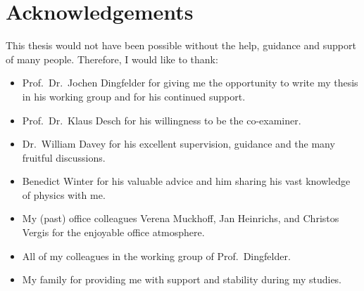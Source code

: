 \chapter{Acknowledgements}
\label{sec:ack}

This thesis would not have been possible without the help, guidance and support
of many people. Therefore, I would like to thank:
\begin{itemize}
\item Prof.\ Dr.\ Jochen Dingfelder for giving me the opportunity to write my
  thesis in his working group and for his continued support.

\item Prof.\ Dr.\ Klaus Desch for his willingness to be the co-examiner.

\item Dr.\ William Davey for his excellent supervision, guidance and the many
  fruitful discussions.

\item Benedict Winter for his valuable advice and him sharing his vast
  knowledge of physics with me.

\item My (past) office colleagues Verena Muckhoff, Jan Heinrichs, and Christos
  Vergis for the enjoyable office atmosphere.

\item All of my colleagues in the working group of Prof.\ Dingfelder.

\item My family for providing me with support and stability during my studies.

\end{itemize}




